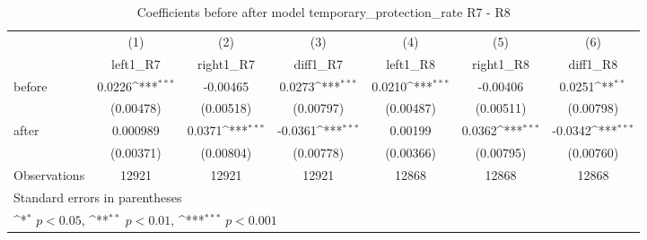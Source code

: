 \begin{table}[!ht]\centering \footnotesize
\def\sym#1{\ifmmode^{#1}\else\(^{#1}\)\fi}
\caption{Coefficients before after model temporary\_protection\_rate R7 - R8}
\begin{tabular}{l*{6}{c}}
\hline\hline
                    &\multicolumn{1}{c}{(1)}&\multicolumn{1}{c}{(2)}&\multicolumn{1}{c}{(3)}&\multicolumn{1}{c}{(4)}&\multicolumn{1}{c}{(5)}&\multicolumn{1}{c}{(6)}\\
                    &\multicolumn{1}{c}{left1\_R7}&\multicolumn{1}{c}{right1\_R7}&\multicolumn{1}{c}{diff1\_R7}&\multicolumn{1}{c}{left1\_R8}&\multicolumn{1}{c}{right1\_R8}&\multicolumn{1}{c}{diff1\_R8}\\
\hline
before              &      0.0226\sym{***}&    -0.00465         &      0.0273\sym{***}&      0.0210\sym{***}&    -0.00406         &      0.0251\sym{**} \\
                    &   (0.00478)         &   (0.00518)         &   (0.00797)         &   (0.00487)         &   (0.00511)         &   (0.00798)         \\
[1em]
after               &    0.000989         &      0.0371\sym{***}&     -0.0361\sym{***}&     0.00199         &      0.0362\sym{***}&     -0.0342\sym{***}\\
                    &   (0.00371)         &   (0.00804)         &   (0.00778)         &   (0.00366)         &   (0.00795)         &   (0.00760)         \\
\hline
Observations        &       12921         &       12921         &       12921         &       12868         &       12868         &       12868         \\
\hline\hline
\multicolumn{7}{l}{\footnotesize Standard errors in parentheses}\\
\multicolumn{7}{l}{\footnotesize \sym{*} \(p<0.05\), \sym{**} \(p<0.01\), \sym{***} \(p<0.001\)}\\
\end{tabular}
\end{table}
